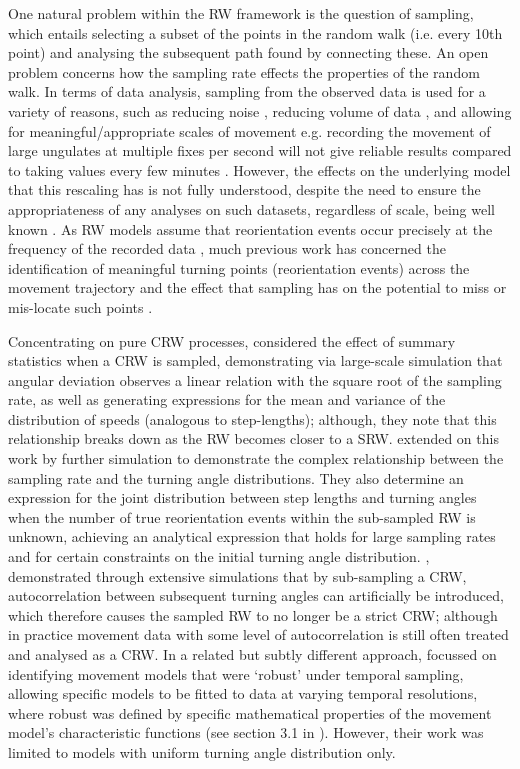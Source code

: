 \documentclass[english]{article}
\begin{document}
One natural problem within the RW framework is the question of sampling, which entails selecting a subset of the points in the random walk (i.e. every 10th point) and analysing the subsequent path found by connecting these.  An open problem concerns how the sampling rate effects the properties of the random walk.  In terms of data analysis, sampling from the observed data is used for a variety of reasons, such as reducing noise \citep{bailey2021micropersonality}, reducing volume of data \citep{gupte2022guide}, and allowing for meaningful/appropriate scales of movement e.g. recording the movement of large ungulates at multiple fixes per second will not give reliable results compared to taking values every few minutes \citep{nathan2022big,schlagel2016robustness,potts2018finding}.  However, the effects on the underlying model that this rescaling has is not fully understood, despite the need to ensure the appropriateness of any analyses on such datasets, regardless of scale, being well known \citep{schlagel2016robustness}.  As RW models assume that reorientation events occur precisely at the frequency of the recorded data \citep{codling2005sampling}, much previous work has concerned the identification of meaningful turning points (reorientation events) across the movement trajectory and the effect that sampling has on the potential to miss or mis-locate such points \citep{codling2005sampling,nathan2022big}.


Concentrating on pure CRW processes, \citet{codling2005sampling} considered the effect of summary statistics when a CRW is sampled, demonstrating via large-scale simulation that angular deviation observes a linear relation with the square root of the sampling rate, as well as generating expressions for the mean and variance of the distribution of speeds  (analogous to step-lengths); although, they note that this relationship breaks down as the RW becomes closer to a SRW.  \citet{rosser2013effect} extended on this work by further simulation to demonstrate the complex relationship between the sampling rate and the turning angle distributions.  They also determine an expression for the joint distribution between step lengths and turning angles when the number of true reorientation events within the sub-sampled RW is unknown, achieving an analytical expression that holds for large sampling rates and for certain constraints on the initial turning angle distribution.  \citet{nams2013sampling}, demonstrated through extensive simulations that by sub-sampling a CRW, autocorrelation between subsequent turning angles can artificially be introduced, which therefore causes the sampled RW to no longer be a strict CRW; although in practice movement data with some level of autocorrelation is still often treated and analysed as a CRW.  In a related but subtly different approach, \citet{schlagel2016robustness} focussed on identifying movement models that were `robust' under temporal sampling, allowing specific models to be fitted to data at varying temporal resolutions, where robust was defined by specific mathematical properties of the movement model's characteristic functions (see section 3.1 in \citet{schlagel2016robustness}).  However, their work was limited to models with uniform turning angle distribution only.
\end{document}
